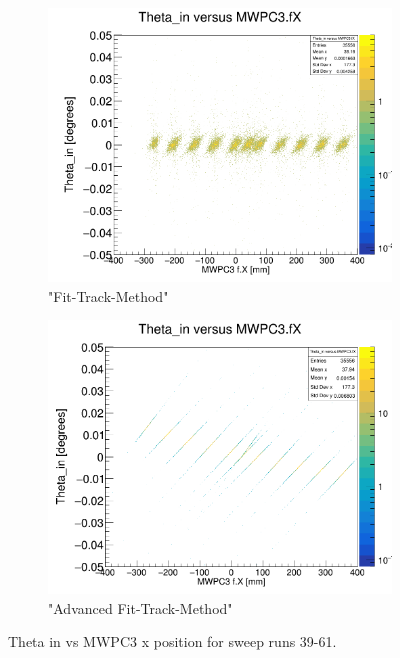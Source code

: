 \documentclass[12pt, letterpaper]{article}
\begin{document}
\begin{figure}[!htbp]
\begin{subfigure}{.5\textwidth}
  \label{fig:sub-second}
\end{subfigure}
\begin{subfigure}{.5\textwidth}
  \centering
  \includegraphics[width=.9\linewidth]{plot_imgs/theta_in_mw3_fit.png} 
  \caption{"Fit-Track-Method"}
  \label{fig:sub-second}
\end{subfigure}
\begin{subfigure}{.5\textwidth}
  \centering
  \includegraphics[width=.9\linewidth]{plot_imgs/theta_in_mw3_last.png} 
  \caption{"Advanced Fit-Track-Method"}
  \label{fig:sub-second}
\end{subfigure}
\caption{Theta \textunderscore in vs MWPC3 x position for sweep runs 39-61.}
\label{fig:fig}
\end{figure}
\FloatBarrier
\clearpage
\end{document}
